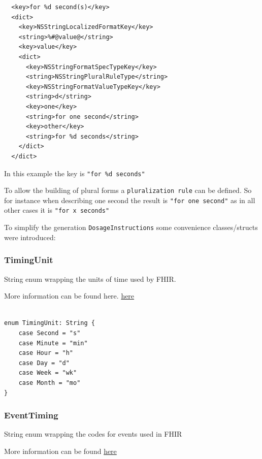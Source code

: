 \documentclass{article}
\begin{document}
\begin{verbatim}
  <key>for %d second(s)</key>
  <dict>
    <key>NSStringLocalizedFormatKey</key>
    <string>%#@value@</string>
    <key>value</key>
    <dict>
      <key>NSStringFormatSpecTypeKey</key>
      <string>NSStringPluralRuleType</string>
      <key>NSStringFormatValueTypeKey</key>
      <string>d</string>
      <key>one</key>
      <string>for one second</string>
      <key>other</key>
      <string>for %d seconds</string>
    </dict>
  </dict>
\end{verbatim}
In this example the key is \texttt{"for\ \%d\ seconds"}

To allow the building of plural forms a \texttt{pluralization rule} can be defined.
So for instance when describing one second the result is \texttt{"for\ one\ second"} as in
all other cases it is \texttt{"for\ x\ seconds"}

To simplify the generation \texttt{DosageInstructions} some convenience
classes/structs were introduced:

\subsubsection{TimingUnit}\label{timingunit}
String enum wrapping the units of time used by FHIR.

More information can be found here.
\href{https://www.hl7.org/fhir/valueset-units-of-time.html}{here}

\begin{verbatim}

enum TimingUnit: String {
    case Second = "s"
    case Minute = "min"
    case Hour = "h"
    case Day = "d"
    case Week = "wk"
    case Month = "mo"
}
\end{verbatim}

\subsubsection{EventTiming}\label{eventtiming}
String enum wrapping the codes for events used in FHIR

More information can be found
\href{http://hl7.org/fhir/v3/TimingEvent}{here}
\end{document}
